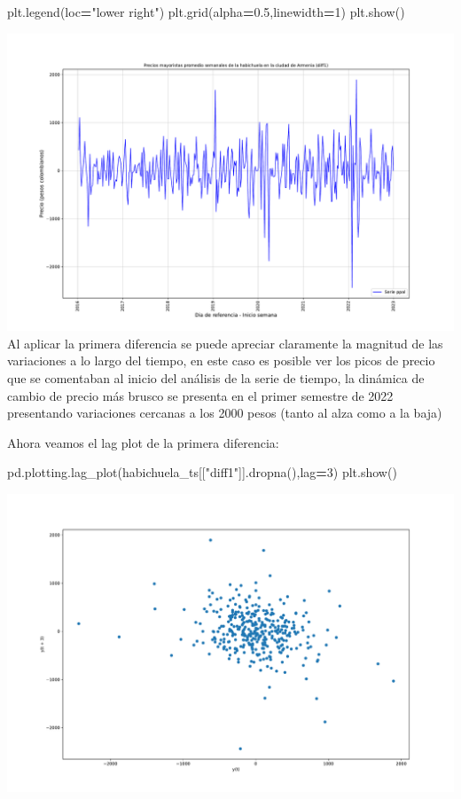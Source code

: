 \documentclass[
]{book}
\newenvironment{Shaded}{\begin{snugshade}}{\end{snugshade}}
\newcommand{\DecValTok}[1]{\textcolor[rgb]{0.00,0.00,0.81}{#1}}
\newcommand{\FloatTok}[1]{\textcolor[rgb]{0.00,0.00,0.81}{#1}}
\newcommand{\NormalTok}[1]{#1}
\newcommand{\OperatorTok}[1]{\textcolor[rgb]{0.81,0.36,0.00}{\textbf{#1}}}
\newcommand{\StringTok}[1]{\textcolor[rgb]{0.31,0.60,0.02}{#1}}
\begin{document}
\begin{Shaded}
\begin{Highlighting}[]
\NormalTok{plt.legend(loc}\OperatorTok{=}\StringTok{"lower right"}\NormalTok{)}
\NormalTok{plt.grid(alpha}\OperatorTok{=}\FloatTok{0.5}\NormalTok{,linewidth}\OperatorTok{=}\DecValTok{1}\NormalTok{)}
\NormalTok{plt.show()}
\end{Highlighting}
\end{Shaded}

\includegraphics{bookdown-demo_files/figure-latex/unnamed-chunk-70-37.pdf}
Al aplicar la primera diferencia se puede apreciar claramente la magnitud de las variaciones a lo largo del tiempo, en este caso es posible ver los picos de precio que se comentaban al inicio del análisis de la serie de tiempo, la dinámica de cambio de precio más brusco se presenta en el primer semestre de 2022 presentando variaciones cercanas a los 2000 pesos (tanto al alza como a la baja)

Ahora veamos el lag plot de la primera diferencia:

\begin{Shaded}
\begin{Highlighting}[]

\NormalTok{pd.plotting.lag\_plot(habichuela\_ts[[}\StringTok{"diff1"}\NormalTok{]].dropna(),lag}\OperatorTok{=}\DecValTok{3}\NormalTok{)}
\NormalTok{plt.show()}
\end{Highlighting}
\end{Shaded}

\includegraphics{bookdown-demo_files/figure-latex/unnamed-chunk-71-39.pdf}
\end{document}
